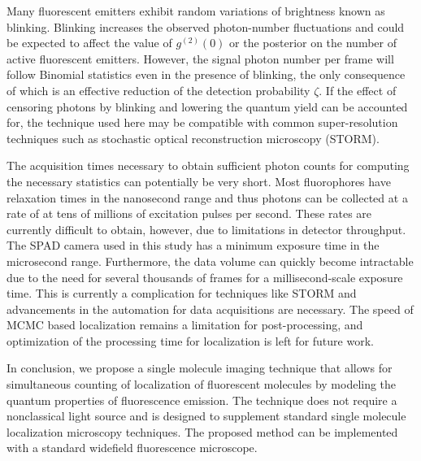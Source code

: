 Many fluorescent emitters exhibit random variations of brightness known as blinking. Blinking increases the observed photon-number fluctuations and could be expected to affect the value of $g^{(2)}(0)$ or the posterior on the number of active fluorescent emitters. However, the signal photon number per frame will follow Binomial statistics even in the presence of blinking, the only consequence of which is an effective reduction of the detection probability $\zeta$. If the effect of censoring photons by blinking and lowering the quantum yield can be accounted for, the technique used here may be compatible with common super-resolution techniques such as stochastic optical reconstruction microscopy (STORM). 

The acquisition times necessary to obtain sufficient photon counts for computing the necessary statistics can potentially be very short. Most fluorophores have relaxation times in the nanosecond range and thus photons can be collected at a rate of at tens of millions of excitation pulses per second. These rates are currently difficult to obtain, however, due to limitations in detector throughput. The SPAD camera used in this study has a minimum exposure time in the microsecond range. Furthermore, the data volume can quickly become intractable due to the need for several thousands of frames for a millisecond-scale exposure time. This is currently a complication for techniques like STORM and advancements in the automation for data acquisitions are necessary. The speed of MCMC based localization remains a limitation for post-processing, and optimization of the processing time for localization is left for future work. 

In conclusion, we propose a single molecule imaging technique that allows for simultaneous counting of localization of fluorescent molecules by modeling the quantum properties of fluorescence emission. The technique does not require a nonclassical light source and is designed to supplement standard single molecule localization microscopy techniques. The proposed method can be implemented with a standard widefield fluorescence microscope.


